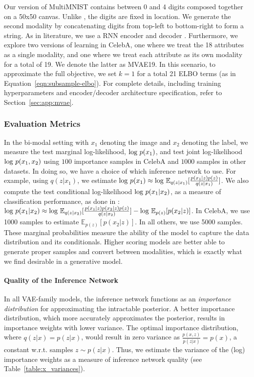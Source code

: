 Our version of MultiMNIST contains between 0 and 4 digits composed together on a 50x50 canvas. Unlike \cite{eslami2016attend}, the digits are fixed in location. We generate the second modality by concatenating digits from top-left to bottom-right to form a string. As in literature, we use a RNN encoder and decoder \cite{bowman2015generating}. Furthermore, we explore two versions of learning in CelebA, one where we treat the 18 attributes as a single modality, and one where we treat each attribute as its own modality for a total of 19. We denote the latter as MVAE19. In this scenario, to approximate the full objective, we set $k = 1$ for a total 21 ELBO terms (as in Equation~\ref{eqn:subsample-elbo}). For complete details, including training hyperparameters and encoder/decoder architecture specification, refer to Section~\ref{sec:app:mvae}.

\subsubsection{Evaluation Metrics}

In the bi-modal setting with $x_1$ denoting the image and $x_2$ denoting the label, we measure the test marginal log-likelihood, $\textup{log }p(x_{1})$, and test joint log-likelihood $\textup{log }p(x_1, x_2)$ using $100$ importance samples in CelebA and $1000$ samples in other datasets. In doing so, we have a choice of which inference network to use. For example, using $q(z|x_1)$, we estimate $\textup{log } p(x_1) \approx \textup{log } \mathbb{E}_{q(z|x_1)}[ \frac{p(x_1|z)p(z)}{q(z|x_1)} ]$. We also compute the test conditional log-likelihood $\textup{log }p(x_1|x_2)$, as a measure of classification performance, as done in \cite{suzuki2016joint}: $\textup{log } p(x_1|x_2) \approx \textup{log } \mathbb{E}_{q(z|x_2)}[ \frac{p(x_1|z)p(x_2|z)p(z)}{q(z|x_2)}] - \textup{log }\mathbb{E}_{p(z)}[p(x_2|z)]$.
In CelebA, we use 1000 samples to estimate $\mathbb{E}_{p(z)}[p(x_2|z)]$. In all others, we use 5000 samples. These marginal probabilities measure the ability of the model to capture the data distribution and its conditionals. Higher scoring models are better able to generate proper samples and convert between modalities, which is exactly what we find desirable in a generative model.

\paragraph{Quality of the Inference Network} In all VAE-family models, the inference network functions as an \textit{importance distribution} for approximating the intractable posterior. A better importance distribution, which more accurately approximates the posterior, results in importance weights with lower variance. The optimal importance distribution, where $q(z|x) = p(z|x)$, would result in zero variance as $\frac{p(x,z)}{p(z|x)} = p(x)$, a constant w.r.t. samples $z \sim p(z|x)$. Thus, we estimate the variance of the (log) importance weights as a measure of inference network quality (see Table~\ref{table:x_variances}).

